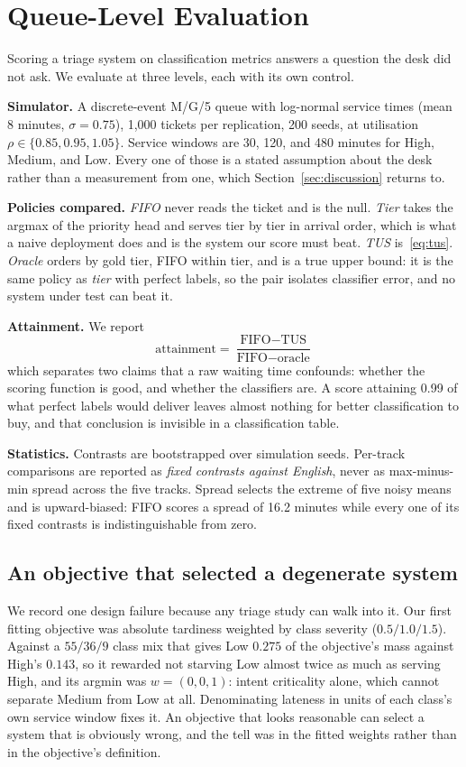 \section{Queue-Level Evaluation}
\label{sec:eval}

Scoring a triage system on classification metrics answers a question the desk did
not ask. We evaluate at three levels, each with its own control.

\textbf{Simulator.} A discrete-event M/G/5 queue with log-normal service times
(mean 8 minutes, $\sigma = 0.75$), 1{,}000 tickets per replication, 200 seeds,
at utilisation $\rho \in \{0.85, 0.95, 1.05\}$. Service windows are 30, 120, and
480 minutes for High, Medium, and Low. Every one of those is a stated assumption
about the desk rather than a measurement from one, which
Section~\ref{sec:discussion} returns to.

\textbf{Policies compared.} \emph{FIFO} never reads the ticket and is the null.
\emph{Tier} takes the argmax of the priority head and serves tier by tier in
arrival order, which is what a naive deployment does and is the system our score
must beat. \emph{TUS} is~\eqref{eq:tus}. \emph{Oracle} orders by gold tier, FIFO
within tier, and is a true upper bound: it is the same policy as \emph{tier}
with perfect labels, so the pair isolates classifier error, and no system under
test can beat it.

\textbf{Attainment.} We report
\[
\text{attainment} = \frac{\text{FIFO} - \text{TUS}}{\text{FIFO} - \text{oracle}}
\]
which separates two claims that a raw waiting time confounds: whether the scoring
function is good, and whether the classifiers are. A score attaining 0.99 of what
perfect labels would deliver leaves almost nothing for better classification to
buy, and that conclusion is invisible in a classification table.

\textbf{Statistics.} Contrasts are bootstrapped over simulation seeds. Per-track
comparisons are reported as \emph{fixed contrasts against English}, never as
max-minus-min spread across the five tracks. Spread selects the extreme of five
noisy means and is upward-biased: FIFO scores a spread of 16.2 minutes while
every one of its fixed contrasts is indistinguishable from zero.

\subsection{An objective that selected a degenerate system}

We record one design failure because any triage study can walk into it. Our first
fitting objective was absolute tardiness weighted by class severity
($0.5 / 1.0 / 1.5$). Against a $55/36/9$ class mix that gives Low $0.275$ of the
objective's mass against High's $0.143$, so it rewarded not starving Low almost
twice as much as serving High, and its argmin was $w = (0,0,1)$: intent
criticality alone, which cannot separate Medium from Low at all. Denominating
lateness in units of each class's own service window fixes it. An objective that
looks reasonable can select a system that is obviously wrong, and the tell was in
the fitted weights rather than in the objective's definition.
